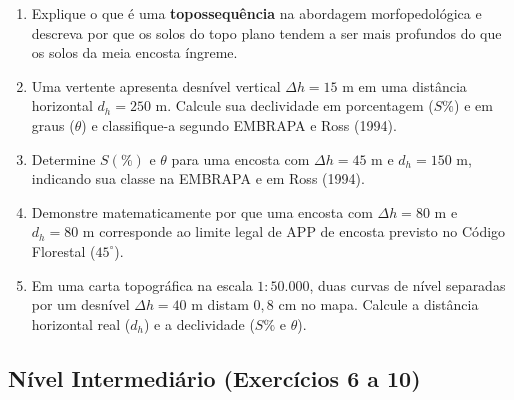 \begin{enumerate}[leftmargin=1.8em, itemsep=4pt]
  \item Explique o que é uma \textbf{topossequência} na abordagem morfopedológica e descreva por que os solos do topo plano tendem a ser mais profundos do que os solos da meia encosta íngreme.
  \espacoResolucao[2.0cm]

  \item Uma vertente apresenta desnível vertical $\Delta h = 15\text{ m}$ em uma distância horizontal $d_h = 250\text{ m}$. Calcule sua declividade em porcentagem ($S\%$) e em graus ($\theta$) e classifique-a segundo EMBRAPA e Ross (1994).
  \espacoResolucao[1.8cm]

  \item Determine $S(\%)$ e $\theta$ para uma encosta com $\Delta h = 45\text{ m}$ e $d_h = 150\text{ m}$, indicando sua classe na EMBRAPA e em Ross (1994).
  \espacoResolucao[1.8cm]

  \item Demonstre matematicamente por que uma encosta com $\Delta h = 80\text{ m}$ e $d_h = 80\text{ m}$ corresponde ao limite legal de APP de encosta previsto no Código Florestal ($45^\circ$).
  \espacoResolucao[1.8cm]

  \item Em uma carta topográfica na escala $1{:}50.000$, duas curvas de nível separadas por um desnível $\Delta h = 40\text{ m}$ distam $0{,}8\text{ cm}$ no mapa. Calcule a distância horizontal real ($d_h$) e a declividade ($S\%$ e $\theta$).
  \espacoResolucao[2.0cm]
\end{enumerate}

\subsection*{Nível Intermediário (Exercícios 6 a 10)}

